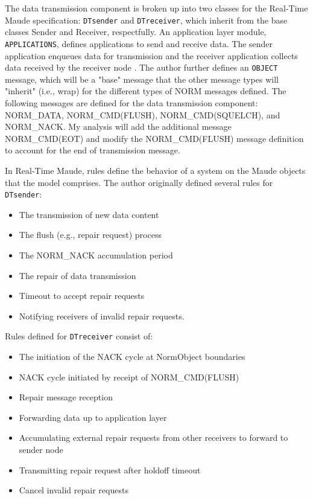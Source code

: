 \documentclass[10pt, journal]{IEEEtran}
\begin{document}
The data transmission component is broken up into two classes for the Real-Time Maude specification: \texttt{DTsender} and \texttt{DTreceiver}, which inherit from the base classes Sender and Receiver, respectfully. An application layer module, \texttt{APPLICATIONS}, defines applications to send and receive data. The sender application enqueues data for transmission and the receiver application collects data received by the receiver node \cite{Lien2004}. The author further defines an \texttt{OBJECT} message, which will be a "base" message that the other message types will "inherit" (i.e., wrap) for the different types of NORM messages defined. The following messages are defined for the data transmission component: NORM\_DATA, NORM\_CMD(FLUSH), NORM\_CMD(SQUELCH), and NORM\_NACK. My analysis will add the additional message NORM\_CMD(EOT) and modify the NORM\_CMD(FLUSH) message definition to account for the end of transmission message.

In Real-Time Maude, rules define the behavior of a system on the Maude objects that the model comprises. The author originally defined several rules for \texttt{DTsender}:
\begin{itemize}
	\item The transmission of new data content
	\item The flush (e.g., repair request) process
	\item The NORM\_NACK accumulation period
	\item The repair of data transmission
	\item Timeout to accept repair requests
	\item Notifying receivers of invalid repair requests. 
\end{itemize}
\noindent
Rules defined for \texttt{DTreceiver} consist of:
\begin{itemize}
	\item The initiation of the NACK cycle at NormObject boundaries
	\item NACK cycle initiated by receipt of NORM\_CMD(FLUSH)
	\item Repair message reception
	\item Forwarding data up to application layer
	\item Accumulating external repair requests from other receivers to forward to sender node
	\item Transmitting repair request after holdoff timeout
	\item Cancel invalid repair requests
\end{itemize}
\end{document}
